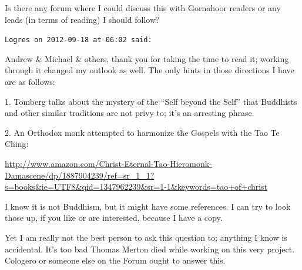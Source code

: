 \begin{footnotesize}
\begin{sffamily}
Is there any forum where I could discuss this with Gornahoor readers or any leads (in terms of reading) I should follow?

\hfill

\texttt{Logres on 2012-09-18 at 06:02 said:}

Andrew \& Michael \& others, thank you for taking the time to read it; working through it changed my outlook as well. The only hints in those directions I have are as follows:

1. Tomberg talks about the mystery of the ``Self beyond the Self'' that Buddhists and other similar traditions are not privy to; it's an arresting phrase.

2. An Orthodox monk attempted to harmonize the Gospels with the Tao Te Ching:

\url{http://www.amazon.com/Christ-Eternal-Tao-Hieromonk-Damascene/dp/1887904239/ref=sr\_1\_1?s=books\&ie=UTF8\&qid=1347962239\&sr=1-1\&keywords=tao+of+christ}

I know it is not Buddhism, but it might have some references. I can try to look those up, if you like or are interested, because I have a copy.

Yet I am really not the best person to ask this question to; anything I know is accidental. It's too bad Thomas Merton died while working on this very project. Cologero or someone else on the Forum ought to answer this.


\hfill

\end{sffamily}
\end{footnotesize}

